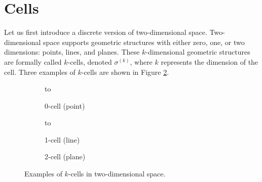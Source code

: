\section{Cells}

Let us first introduce a discrete version of two-dimensional space. Two-dimensional space supports geometric structures with either zero, one, or two dimensions: points, lines, and planes. These $k$-dimensional geometric structures are formally called $k$-cells, denoted $\sigma^{(k)}$, where $k$ represents the dimension of the cell. Three examples of $k$-cells are shown in Figure \ref{fig:cells}.
\begin{figure}[ht]
    \newsavebox\boxCell
    \centering
    \begin{subfigure}[c]{0.3\textwidth}
        \centering
        \vbox to \ht{}
        \caption{0-cell (point)}
    \end{subfigure}
    \begin{subfigure}[c]{0.3\textwidth}
        \centering
        \vbox to \ht{}
        \caption{1-cell (line)}
    \end{subfigure}
    \begin{subfigure}[c]{0.3\textwidth}
        \centering
        \usebox{\boxCell}
        \caption{2-cell (plane)}
        \label{fig:2cell}
    \end{subfigure}
    \caption{Examples of $k$-cells in two-dimensional space.}
    \label{fig:cells}
\end{figure}

